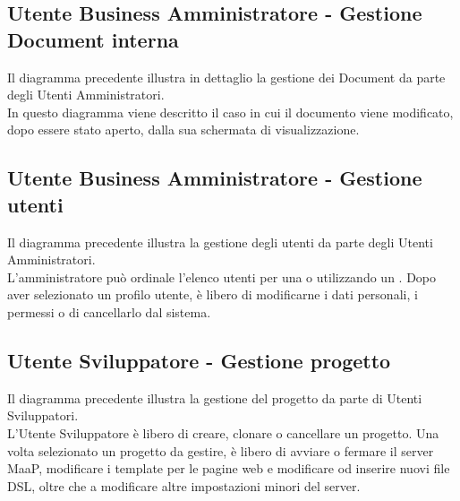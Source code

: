 \subsection{Utente Business Amministratore - Gestione Document interna}
Il diagramma precedente illustra in dettaglio la gestione dei Document da parte degli Utenti Amministratori.\\
In questo diagramma viene descritto il caso in cui il documento viene modificato, dopo essere stato aperto, dalla sua schermata di visualizzazione.

\subsection{Utente Business Amministratore - Gestione utenti}
Il diagramma precedente illustra la gestione degli utenti da parte degli Utenti Amministratori.\\
L'amministratore può ordinale l'elenco utenti per una  o utilizzando un . Dopo aver selezionato un profilo utente, è libero di modificarne i dati personali, i permessi o di cancellarlo dal sistema.

\subsection{Utente Sviluppatore - Gestione progetto}
Il diagramma precedente illustra la gestione del progetto da parte di Utenti Sviluppatori.\\
L'Utente Sviluppatore è libero di creare, clonare o cancellare un progetto. Una volta selezionato un progetto da gestire, è libero di avviare o fermare il server MaaP, modificare i template per le pagine web e modificare od inserire nuovi file DSL, oltre che a modificare altre impostazioni minori del server.
